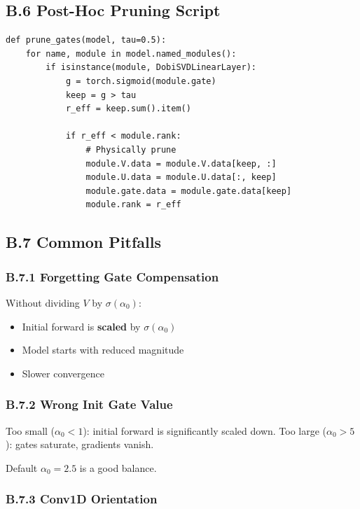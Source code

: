 \subsection{B.6 Post-Hoc Pruning Script}

\begin{lstlisting}
def prune_gates(model, tau=0.5):
    for name, module in model.named_modules():
        if isinstance(module, DobiSVDLinearLayer):
            g = torch.sigmoid(module.gate)
            keep = g > tau
            r_eff = keep.sum().item()
            
            if r_eff < module.rank:
                # Physically prune
                module.V.data = module.V.data[keep, :]
                module.U.data = module.U.data[:, keep]
                module.gate.data = module.gate.data[keep]
                module.rank = r_eff
\end{lstlisting}

\subsection{B.7 Common Pitfalls}

\subsubsection{B.7.1 Forgetting Gate Compensation}

Without dividing $V$ by $\sigma(\alpha_0)$:
\begin{itemize}
\item Initial forward is \textbf{scaled} by $\sigma(\alpha_0)$
\item Model starts with reduced magnitude
\item Slower convergence

\end{itemize}
\subsubsection{B.7.2 Wrong Init Gate Value}

Too small ($\alpha_0 < 1$): initial forward is significantly scaled down.
Too large ($\alpha_0 > 5$): gates saturate, gradients vanish.

Default $\alpha_0 = 2.5$ is a good balance.

\subsubsection{B.7.3 Conv1D Orientation}

